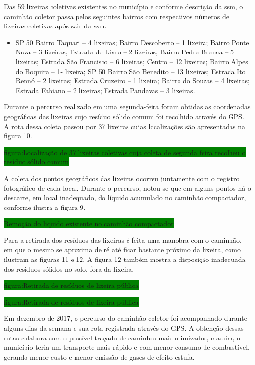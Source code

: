 	Das 59 lixeiras coletivas existentes no município e conforme descrição da \gls{ssm}, o caminhão coletor passa pelos seguintes bairros com respectivos números de lixeiras coletivas após sair da \gls{ssm}:
	
	\begin{itemize}
		\item SP 50 Bairro Taquari – 4 lixeiras; 
		Bairro Descoberto – 1 lixeira; 
		Bairro Ponte Nova – 3 lixeiras; 
		Estrada do Livro – 2 lixeiras; 
		Bairro Pedra Branca – 5 lixeiras; 
		Estrada São Francisco – 6 lixeiras; 
		Centro – 12 lixeiras; 
		Bairro Alpes do Boquira – 1- lixeira; 
		SP 50 Bairro São Benedito – 13 lixeiras; 
		Estrada Ito Rennó – 2 lixeiras; 
		Estrada Cruzeiro – 1 lixeira; 
		Bairro do Souzas – 4 lixeiras; 
		Estrada Fabiano – 2 lixeiras; 
		Estrada Pandavas – 3 lixeiras.
	\end{itemize}

	Durante o percurso realizado em uma segunda-feira foram obtidas as coordenadas geográficas das lixeiras cujo resíduo sólido comum foi recolhido através do GPS. A rota dessa coleta passou por 37 lixeiras cujas localizações são apresentadas na figura 10. 
	
	\colorbox{green}{figura:Localização de 37 lixeiras coletivas cuja coleta de segunda feira recolheu o resíduo sólido comum}
	
	A coleta dos pontos geográficos das lixeiras ocorreu juntamente com o registro fotográfico de cada local.  Durante o percurso, notou-se que em alguns pontos há o descarte, em local inadequado, do líquido acumulado no caminhão compactador, conforme ilustra a figura 9.
	
	\colorbox{green}{Remoção do liquido existente no caminhão compactador}
	
	Para a retirada dos resíduos das lixeiras é feita uma manobra com o caminhão, em que o mesmo se aproxima de ré até ficar bastante próximo da lixeira, como ilustram as figuras 11 e 12. A figura 12 também mostra a disposição inadequada dos resíduos sólidos no solo, fora da lixeira.
	
	\colorbox{green}{figura:Retirada de resíduos de lixeira pública}
	
	\colorbox{green}{figura:Retirada de resíduos de lixeira pública}
	
	Em dezembro de 2017, o percurso do caminhão coletor foi acompanhado durante alguns dias da semana e sua rota registrada através do GPS. A obtenção dessas rotas colabora com o possível traçado de caminhos mais otimizados, e assim, o município teria um transporte mais rápido e com menor consumo de combustível, gerando menor custo e menor emissão de gases de efeito estufa.
	
